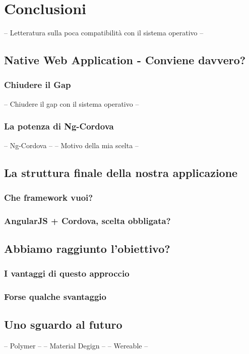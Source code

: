 \chapter{Conclusioni}
-- Letteratura sulla poca compatibilità con il sistema operativo --
\section{Native Web Application - Conviene davvero?}
\subsection{Chiudere il Gap}
-- Chiudere il gap con il sistema operativo --
\subsection{La potenza di Ng-Cordova}
-- Ng-Cordova --
-- Motivo della mia scelta --
\section{La struttura finale della nostra applicazione}
\subsection{Che framework vuoi?}
\subsection{AngularJS + Cordova, scelta obbligata?}
\section{Abbiamo raggiunto l'obiettivo?}
\subsection{I vantaggi di questo approccio}
\subsection{Forse qualche svantaggio}
\section{Uno sguardo al futuro}
-- Polymer --
-- Material Degign --
-- Wereable --

